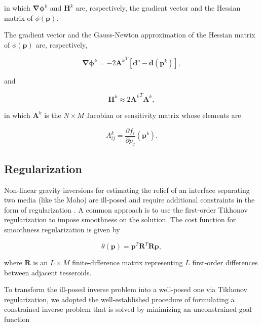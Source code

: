 \documentclass[extra,mreferee]{gji}
\begin{document}
\noindent in which
$\mathbf{\nabla\phi}^k$ and $\mathbf{H}^k$ are, respectively,
the gradient vector and the Hessian matrix of $\phi(\mathbf{p})$.

The gradient vector and the Gauss-Newton approximation of the Hessian matrix
of $\phi(\mathbf{p})$ are, respectively,

\begin{equation}
    \mathbf{\nabla\phi}^k = -2{\mathbf{A}^k}^T[\mathbf{d}^o - \mathbf{d}(\mathbf{p}^k)],
    \label{eq:gradient}
\end{equation}

\noindent
and

\begin{equation}
    \mathbf{H}^k \approx 2{\mathbf{A}^k}^T{\mathbf{A}^k},
    \label{eq:hessian}
\end{equation}

\noindent in which
$\mathbf{A}^k$ is the $N \times M$ Jacobian or sensitivity matrix
whose elements are

\begin{equation}
    A_{ij}^k = \dfrac{\partial f_i}{\partial p_j}(\mathbf{p}^k).
    \label{eq:jacobian}
\end{equation}



\subsection{Regularization}

Non-linear gravity inversions for estimating the relief of an interface
separating two media (like the Moho) are ill-posed and require additional
constraints in the form of regularization \citep{silva2001b}.
A common approach is to use the first-order Tikhonov regularization
\citep{tikhonov1977} to impose smoothness on the solution.
The cost function for smoothness regularization is given by

\begin{equation}
    \theta(\mathbf{p}) = \mathbf{p}^T\mathbf{R}^T\mathbf{R}\mathbf{p},
    \label{eq:regul}
\end{equation}

\noindent where $\mathbf{R}$ is an $L \times M$ finite-difference matrix
representing $L$ first-order differences between adjacent tesseroids.

To transform the ill-posed inverse problem into a well-posed one via Tikhonov
regularization, we adopted the well-established procedure
of formulating a constrained inverse problem that is solved by minimizing an
unconstrained goal function
\end{document}
